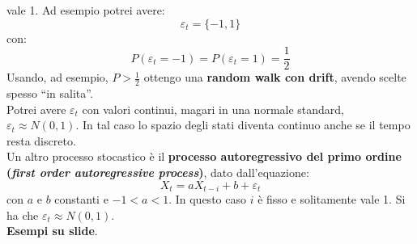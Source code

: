 \message{ !name(modprob.tex)}\documentclass[a4paper,12pt, oneside]{book}
\begin{document}
vale 1. Ad esempio potrei avere:
\[\varepsilon_t=\{-1,1\}\]
con:
\[P(\varepsilon_t=-1)=P(\varepsilon_t=1)=\frac{1}{2}\]
Usando, ad esempio, $P>\frac{1}{2}$ ottengo una \textbf{random walk con drift},
avendo scelte spesso ``in salita''.\\
Potrei avere $\varepsilon_t$ con valori continui, magari in una normale
standard, $\varepsilon_t\approx N(0,1)$. In tal caso lo spazio degli stati
diventa continuo anche se il tempo resta discreto.\\
Un altro processo stocastico è il \textbf{processo autoregressivo del primo
  ordine (\textit{first order autoregressive process})}, dato dall'equazione:
\[X_t=aX_{t-i}+b+\varepsilon_t\]
con $a$ e $b$ constanti e $-1<a<1$. In questo caso $i$ è fisso e solitamente
vale 1. Si ha che $\varepsilon_t\approx N(0,1)$.\\
\textbf{Esempi su slide}.
\end{document}
